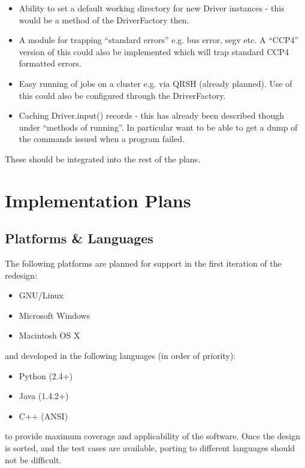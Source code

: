 \documentclass[a4paper, 11pt]{article}
\begin{document}
\begin{itemize}
\item{Ability to set a default working directory for new Driver instances - 
this would be a method of the DriverFactory then.}
\item{A module for trapping ``standard errors'' e.g. bus error, segv etc.
A ``CCP4'' version of this could also be implemented which will trap standard
CCP4 formatted errors.}
\item{Easy running of jobs on a cluster e.g. via QRSH (already planned).
Use of this could also be configured through the DriverFactory.}
\item{Caching Driver.input() records - this has already been described though
under ``methods of running''. In particular want to be able to get a dump of
the commands issued when a program failed.}
\end{itemize}

These should be integrated into the rest of the plans.

\section{Implementation Plans}

\subsection{Platforms \& Languages}

The following platforms are planned for support in the first iteration of the
redesign:

\begin{itemize}
\item{GNU/Linux}
\item{Microsoft Windows}
\item{Macintosh OS X}
\end{itemize}

\noindent
and developed in the following languages (in order of priority):

\begin{itemize}
\item{Python (2.4+)}
\item{Java (1.4.2+)}
\item{C++ (ANSI)}
\end{itemize}

\noindent
to provide maximum coverage and applicability of the software. Once the design
is sorted, and the test cases are available, porting to different languages
should not be difficult.
\end{document}
